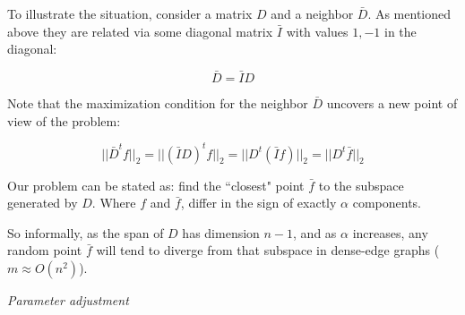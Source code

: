 \documentclass[a4paper,11pt]{article}
\begin{document}
\bigskip

To illustrate the situation, consider a matrix $D$ and a neighbor 
$\bar{D}$. As mentioned above they are related via some diagonal matrix 
$\bar{I}$ with values $1,-1$ in the diagonal:

$$\bar{D} = \bar{I} D$$

Note that the maximization condition for the neighbor $\bar{D}$ uncovers 
a new point of view of the problem:

$$||\bar{D}^tf||_2 = ||(\bar{I} D)^t f||_2 = ||D^t (\bar{I} f)||_2 = 
||D^t \bar{f}||_2$$

Our problem can be stated as: find the ``closest" point $\bar{f}$ to 
the subspace generated by $D$. Where $f$ and $\bar{f}$, differ in the 
sign of exactly $\alpha$ components.

\bigskip

So informally, as the span of $D$ has dimension $n-1$, and as $\alpha$ 
increases, any random point $\bar{f}$ will tend to diverge from that 
subspace in dense-edge graphs ($m \approx O(n^2)$).

\bigskip

\emph{Parameter adjustment}

\bigskip
\end{document}
